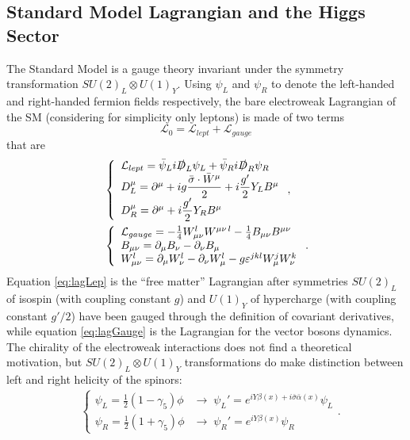 \subsection{Standard Model Lagrangian and the Higgs Sector}\label{sect:higgs}
The Standard Model is a gauge theory invariant under the symmetry transformation $SU(2)_{L} \otimes U(1)_{Y}$. Using $\psi_{L}$ and $\psi_{R}$ to denote the left-handed and right-handed fermion fields respectively, the bare electroweak Lagrangian of the SM (considering for simplicity only leptons) is made of two terms\begin{equation}\label{eq:bareLagSM}
\mathcal{L}_{0} = \mathcal{L}_{lept}+ \mathcal{L}_{gauge}
\end{equation}that are \begin{align}
&\left \{ \begin{array}{ll}
\mathcal{L}_{lept} = \bar\psi_{L}i\slashed{D}_{L}\psi_{L} + \bar\psi_{R}i\slashed{D}_{R}\psi_{R}\\
D_{L}^{\mu} = \partial^{\mu} + ig\dfrac{\bar{\sigma}\cdot\bar{W}^{\mu}}{2} + i\dfrac{g'}{2}Y_{L}B^{\mu}\\
D_{R}^{\mu} = \partial^{\mu} + i\dfrac{g'}{2}Y_{R}B^{\mu}
\end{array} \right. ,\label{eq:lagLep} \\
&\left \{ \begin{array}{ll}
\mathcal{L}_{gauge}  = -\frac{1}{4}W_{\mu\nu}^{l}W^{\mu\nu\, l}  -\frac{1}{4}B_{\mu\nu}B^{\mu\nu}\\
B_{\mu\nu} = \partial_{\mu}B_{\nu} - \partial_{\nu}B_{\mu}\\
W_{\mu\nu}^{l} = \partial_{\mu}W_{\nu}^{l} - \partial_{\nu}W_{\mu}^{l} - g\varepsilon^{jkl}W_{\mu}^{j}W_{\nu}^{k}
\end{array} \right. .\label{eq:lagGauge}
\end{align}
Equation \ref{eq:lagLep} is the ``free matter'' Lagrangian after symmetries $SU(2)_{L}$ of isospin (with coupling constant $g$) and $U(1)_{Y}$ of hypercharge (with coupling constant $g'/2$) have been gauged through the definition of covariant derivatives, while equation \ref{eq:lagGauge} is the Lagrangian for the vector bosons dynamics. The chirality of the electroweak interactions does not find a theoretical motivation, but $SU(2)_{L} \otimes U(1)_{Y}$ transformations do make distinction between left and right helicity of the spinors:\begin{align}
&\left \{ \begin{array}{ll}
\psi_{L} = \frac{1}{2}(1 - \gamma_{5})\phi &\rightarrow \; \psi_{L}' = e^{iY\beta(x) + i\bar{\sigma}\bar{\alpha}(x)}\psi_{L} \\
\psi_{R} = \frac{1}{2}(1 + \gamma_{5})\phi &\rightarrow \; \psi_{R}' = e^{iY\beta(x)}\psi_{R}
\end{array} \right. .
\label{eq:chiral}
\end{align}

